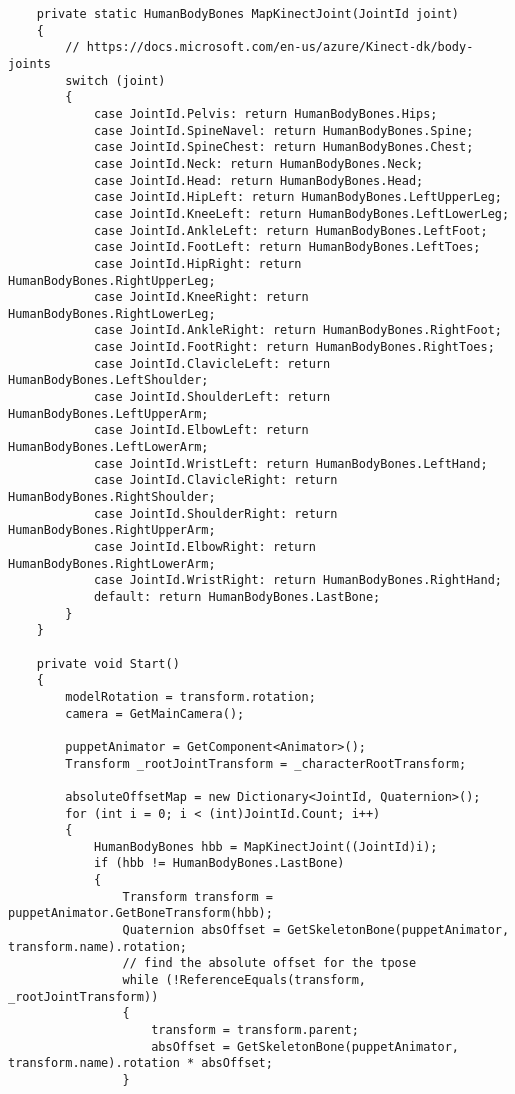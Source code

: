\begin{verbatim}
    private static HumanBodyBones MapKinectJoint(JointId joint)
    {
        // https://docs.microsoft.com/en-us/azure/Kinect-dk/body-joints
        switch (joint)
        {
            case JointId.Pelvis: return HumanBodyBones.Hips;
            case JointId.SpineNavel: return HumanBodyBones.Spine;
            case JointId.SpineChest: return HumanBodyBones.Chest;
            case JointId.Neck: return HumanBodyBones.Neck;
            case JointId.Head: return HumanBodyBones.Head;
            case JointId.HipLeft: return HumanBodyBones.LeftUpperLeg;
            case JointId.KneeLeft: return HumanBodyBones.LeftLowerLeg;
            case JointId.AnkleLeft: return HumanBodyBones.LeftFoot;
            case JointId.FootLeft: return HumanBodyBones.LeftToes;
            case JointId.HipRight: return HumanBodyBones.RightUpperLeg;
            case JointId.KneeRight: return HumanBodyBones.RightLowerLeg;
            case JointId.AnkleRight: return HumanBodyBones.RightFoot;
            case JointId.FootRight: return HumanBodyBones.RightToes;
            case JointId.ClavicleLeft: return HumanBodyBones.LeftShoulder;
            case JointId.ShoulderLeft: return HumanBodyBones.LeftUpperArm;
            case JointId.ElbowLeft: return HumanBodyBones.LeftLowerArm;
            case JointId.WristLeft: return HumanBodyBones.LeftHand;
            case JointId.ClavicleRight: return HumanBodyBones.RightShoulder;
            case JointId.ShoulderRight: return HumanBodyBones.RightUpperArm;
            case JointId.ElbowRight: return HumanBodyBones.RightLowerArm;
            case JointId.WristRight: return HumanBodyBones.RightHand;
            default: return HumanBodyBones.LastBone;
        }
    }

    private void Start()
    {
        modelRotation = transform.rotation;
        camera = GetMainCamera();

        puppetAnimator = GetComponent<Animator>();
        Transform _rootJointTransform = _characterRootTransform;

        absoluteOffsetMap = new Dictionary<JointId, Quaternion>();
        for (int i = 0; i < (int)JointId.Count; i++)
        {
            HumanBodyBones hbb = MapKinectJoint((JointId)i);
            if (hbb != HumanBodyBones.LastBone)
            {
                Transform transform = puppetAnimator.GetBoneTransform(hbb);
                Quaternion absOffset = GetSkeletonBone(puppetAnimator, transform.name).rotation;
                // find the absolute offset for the tpose
                while (!ReferenceEquals(transform, _rootJointTransform))
                {
                    transform = transform.parent;
                    absOffset = GetSkeletonBone(puppetAnimator, transform.name).rotation * absOffset;
                }


\end{verbatim}
